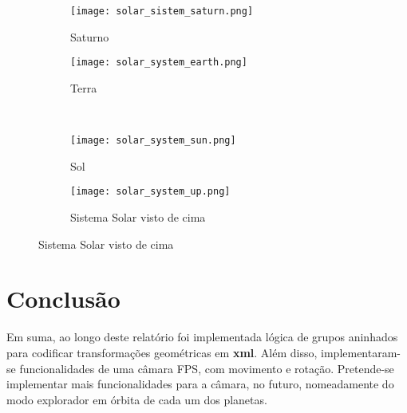 \documentclass[14pt, a4 paper]{report}
\begin{document}
\begin{figure}[t]
    \centering
    \begin{subfigure}{.5\textwidth}
    \centering
    \texttt{[image: solar\_sistem\_saturn.png]}
    \caption{Saturno}
    \label{fig:sub5}
    \end{subfigure}%
    \begin{subfigure}{.5\textwidth}
    \centering
    \texttt{[image: solar\_system\_earth.png]}
    \caption{Terra}
    \label{fig:sub6}
    \end{subfigure}%
    \\
    \begin{subfigure}{.5\textwidth}
    \centering
    \texttt{[image: solar\_system\_sun.png]}
    \caption{Sol}
    \label{fig:sub5}
    \end{subfigure}%
    \begin{subfigure}{.5\textwidth}
    \centering
    \texttt{[image: solar\_system\_up.png]}
    \caption{Sistema Solar visto de cima}
    \label{fig:sub6}
    \end{subfigure}%
    \label{fig:2}
\end{figure}

\chapter{Conclusão} \label{chap:conclusion}

Em suma, ao longo deste relatório foi implementada lógica de grupos aninhados para codificar transformações geométricas em \textbf{xml}. Além disso, implementaram-se funcionalidades de uma câmara FPS, com movimento e rotação. Pretende-se implementar mais funcionalidades para a câmara, no futuro, nomeadamente do modo explorador em órbita de cada um dos planetas.
\end{document}

